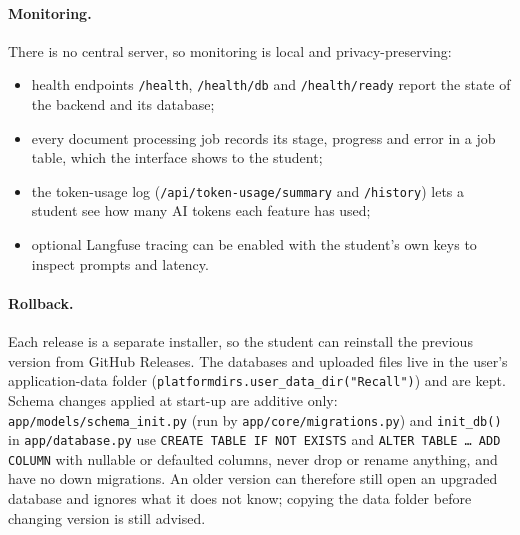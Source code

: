 \paragraph{Monitoring.} There is no central server, so monitoring is local and privacy-preserving:
\begin{itemize}
  \item health endpoints \texttt{/health}, \texttt{/health/db} and \texttt{/health/ready} report
  the state of the backend and its database;
  \item every document processing job records its stage, progress and error in a job table, which
  the interface shows to the student;
  \item the token-usage log (\texttt{/api/token-usage/summary} and \texttt{/history}) lets a
  student see how many AI tokens each feature has used;
  \item optional Langfuse tracing can be enabled with the student's own keys to inspect prompts and
  latency.
\end{itemize}

\paragraph{Rollback.} Each release is a separate installer, so the student can reinstall the
previous version from GitHub Releases. The databases and uploaded files live in the user's
application-data folder (\texttt{platformdirs.user\_data\_dir("Recall")}) and are kept. Schema changes
applied at start-up are additive only: \texttt{app/models/schema\_init.py} (run by
\texttt{app/core/migrations.py}) and \texttt{init\_db()} in \texttt{app/database.py} use
\texttt{CREATE TABLE IF NOT EXISTS} and \texttt{ALTER TABLE \ldots{} ADD COLUMN} with nullable or
defaulted columns, never drop or rename anything, and have no down migrations. An older version can
therefore still open an upgraded database and ignores what it does not know; copying the data folder
before changing version is still advised.
